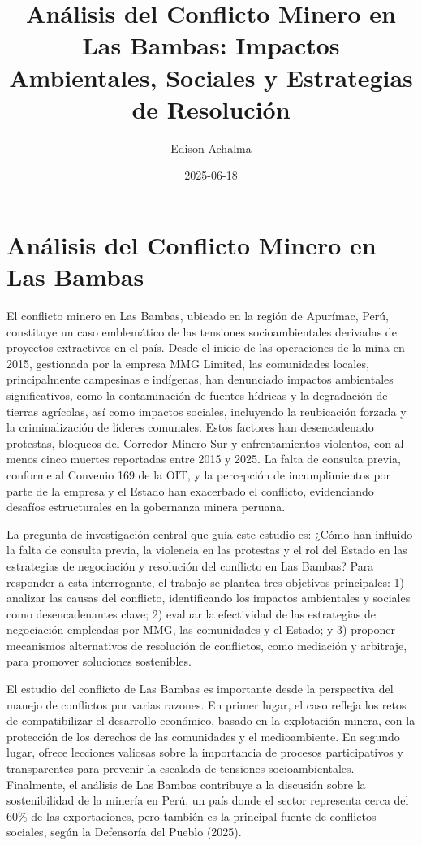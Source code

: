 \documentclass[
  stu,
  floatsintext,
  longtable,
  a4paper,
  nolmodern,
  notxfonts,
  notimes,
  colorlinks=true,linkcolor=blue,citecolor=blue,urlcolor=blue]{apa7}
\title{Análisis del Conflicto Minero en Las Bambas: Impactos
Ambientales, Sociales y Estrategias de Resolución}
\author{Edison Achalma}
\affiliation{
{Escuela Profesional de Economía, Universidad Nacional de San Cristóbal
de Huamanga}}
\date{2025-06-18}
\begin{document}
\maketitle

\hypertarget{toc}{}
\tableofcontents
\newpage
\section[Introduction]{Análisis del Conflicto Minero en Las Bambas}

\setcounter{secnumdepth}{3}

\setlength\LTleft{0pt}


El conflicto minero en Las Bambas, ubicado en la región de Apurímac,
Perú, constituye un caso emblemático de las tensiones socioambientales
derivadas de proyectos extractivos en el país. Desde el inicio de las
operaciones de la mina en 2015, gestionada por la empresa MMG Limited,
las comunidades locales, principalmente campesinas e indígenas, han
denunciado impactos ambientales significativos, como la contaminación de
fuentes hídricas y la degradación de tierras agrícolas, así como
impactos sociales, incluyendo la reubicación forzada y la
criminalización de líderes comunales. Estos factores han desencadenado
protestas, bloqueos del Corredor Minero Sur y enfrentamientos violentos,
con al menos cinco muertes reportadas entre 2015 y 2025. La falta de
consulta previa, conforme al Convenio 169 de la OIT, y la percepción de
incumplimientos por parte de la empresa y el Estado han exacerbado el
conflicto, evidenciando desafíos estructurales en la gobernanza minera
peruana.

La pregunta de investigación central que guía este estudio es: ¿Cómo han
influido la falta de consulta previa, la violencia en las protestas y el
rol del Estado en las estrategias de negociación y resolución del
conflicto en Las Bambas? Para responder a esta interrogante, el trabajo
se plantea tres objetivos principales: 1) analizar las causas del
conflicto, identificando los impactos ambientales y sociales como
desencadenantes clave; 2) evaluar la efectividad de las estrategias de
negociación empleadas por MMG, las comunidades y el Estado; y 3)
proponer mecanismos alternativos de resolución de conflictos, como
mediación y arbitraje, para promover soluciones sostenibles.

El estudio del conflicto de Las Bambas es importante desde la
perspectiva del manejo de conflictos por varias razones. En primer
lugar, el caso refleja los retos de compatibilizar el desarrollo
económico, basado en la explotación minera, con la protección de los
derechos de las comunidades y el medioambiente. En segundo lugar, ofrece
lecciones valiosas sobre la importancia de procesos participativos y
transparentes para prevenir la escalada de tensiones socioambientales.
Finalmente, el análisis de Las Bambas contribuye a la discusión sobre la
sostenibilidad de la minería en Perú, un país donde el sector representa
cerca del 60\% de las exportaciones, pero también es la principal fuente
de conflictos sociales, según la Defensoría del Pueblo (2025).
\end{document}

